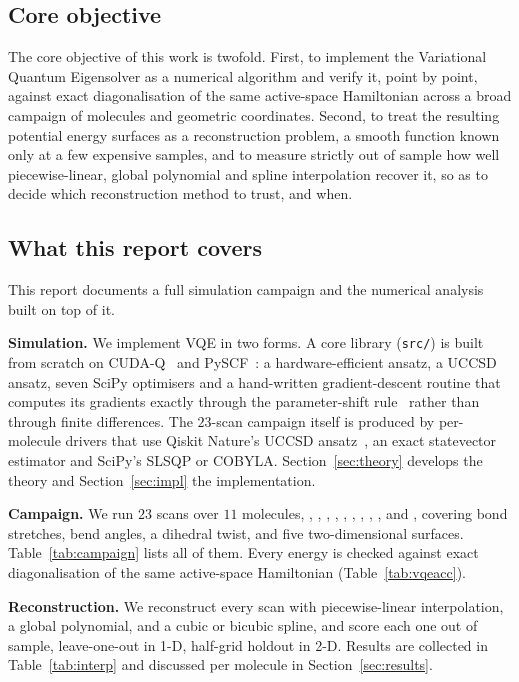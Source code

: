 \documentclass[sigconf,screen,nonacm]{acmart}
\begin{document}
\subsection{Core objective}

The core objective of this work is twofold. First, to implement the
Variational Quantum Eigensolver as a numerical algorithm and verify it, point
by point, against exact diagonalisation of the same active-space Hamiltonian
across a broad campaign of molecules and geometric coordinates. Second, to
treat the resulting potential energy surfaces as a reconstruction problem, a
smooth function known only at a few expensive samples, and to measure
strictly out of sample how well piecewise-linear, global polynomial and spline
interpolation recover it, so as to decide which reconstruction method to
trust, and when.

\subsection{What this report covers}
\label{sec:contributions}

This report documents a full simulation campaign and the numerical analysis
built on top of it.

\textbf{Simulation.} We implement VQE in two forms. A core library
(\texttt{src/}) is built from scratch on CUDA-Q~\cite{cudaq} and
PySCF~\cite{pyscf}: a hardware-efficient ansatz, a UCCSD ansatz, seven SciPy
optimisers and a hand-written gradient-descent routine that computes its
gradients exactly through the parameter-shift rule~\cite{schuld2019} rather
than through finite differences. The $23$-scan campaign itself is produced by
per-molecule drivers that use Qiskit Nature's UCCSD
ansatz~\cite{qiskit}, an exact statevector estimator and SciPy's SLSQP or
COBYLA. Section~\ref{sec:theory} develops the theory and
Section~\ref{sec:impl} the implementation.

\textbf{Campaign.} We run $23$ scans over $11$ molecules, , ,
, , , , , , , 
and , covering bond stretches, bend angles, a dihedral twist, and
five two-dimensional surfaces. Table~\ref{tab:campaign} lists all of them.
Every energy is checked against exact diagonalisation of the same
active-space Hamiltonian (Table~\ref{tab:vqeacc}).

\textbf{Reconstruction.} We reconstruct every scan with piecewise-linear
interpolation, a global polynomial, and a cubic or bicubic spline, and score
each one out of sample, leave-one-out in 1-D, half-grid holdout in 2-D.
Results are collected in Table~\ref{tab:interp} and discussed per molecule in
Section~\ref{sec:results}.
\end{document}
